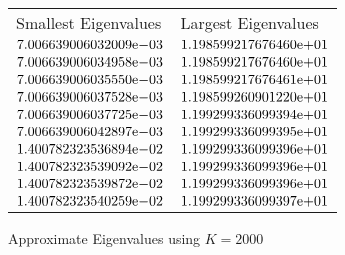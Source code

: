 \begin{enumerate}
\begin{figure}
 \centering    
\begin{tabular}{ ||p{6cm}||p{6cm}|}
\hline
 Smallest Eigenvalues & Largest Eigenvalues \\ \hhline{|=|=|}    
\hline
${7.006639006032009}\mathrm{e}{-03}$ & ${1.198599217676460}\mathrm{e}{+01}$ \\  
${7.006639006034958}\mathrm{e}{-03}$ & ${1.198599217676460}\mathrm{e}{+01}$ \\  
${7.006639006035550}\mathrm{e}{-03}$ & ${1.198599217676461}\mathrm{e}{+01}$ \\  
${7.006639006037528}\mathrm{e}{-03}$ & ${1.198599260901220}\mathrm{e}{+01}$ \\  
${7.006639006037725}\mathrm{e}{-03}$ & ${1.199299336099394}\mathrm{e}{+01}$ \\  
${7.006639006042897}\mathrm{e}{-03}$ & ${1.199299336099395}\mathrm{e}{+01}$ \\  
${1.400782323536894}\mathrm{e}{-02}$ & ${1.199299336099396}\mathrm{e}{+01}$ \\  
${1.400782323539092}\mathrm{e}{-02}$ & ${1.199299336099396}\mathrm{e}{+01}$ \\  
${1.400782323539872}\mathrm{e}{-02}$ & ${1.199299336099396}\mathrm{e}{+01}$ \\  
${1.400782323540259}\mathrm{e}{-02}$ & ${1.199299336099397}\mathrm{e}{+01}$ \\  
\hline  
\end{tabular} 
\caption{Approximate Eigenvalues using $K = 2000$}
   \label{tab:eig2000}
\end{figure} 



\end{enumerate}
